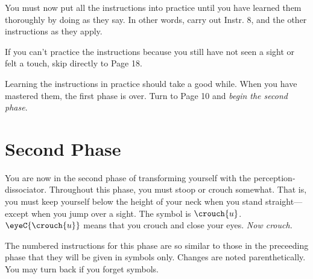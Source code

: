 \vfill
You must now put all the instructions into practice until you have 
learned them thoroughly by doing as they say. In other words, carry out 
Instr. 8, and the other instructions as they apply. 

\vfill
If you can't practice the instructions because you still have not seen a 
sight or felt a touch, skip directly to Page 18. 

\vfill

Learning the instructions in practice should take a good while. When 
you have mastered them, the first phase is over. Turn to Page 10 and \textit{begin the second phase}.

\vfill

\clearpage


\section{Second Phase}

\vfill
You are now in the second phase of transforming yourself with the 
perception-dissociator. Throughout this phase, you must stoop or crouch 
somewhat. That is, you must keep yourself below the height of your neck 
when you stand straight---except when you jump over a sight. The symbol is 
$\crouch{u}$. $\eyeC{\crouch{u}}$ means that you crouch and close your eyes. \emph{Now crouch.}

The numbered instructions for this phase are so similar to those in the 
preceeding phase that they will be given in symbols only. Changes are noted 
parenthetically. You may turn back if you forget symbols. 

